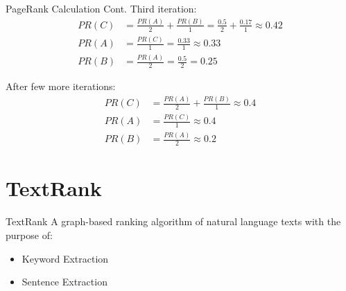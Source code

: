 \documentclass[10pt]{beamer}
\begin{document}
{
\begin{frame}{PageRank Calculation Cont.}\label{pg:calculation}
Third iteration:
 	\begin{align*}
    		PR(C) &=\frac{PR(A)}{2}  + \frac{PR(B)}{1}  = \frac{0.5}{2} + \frac{0.17}{1} \approx 0.42\\
            PR(A) &=\frac{PR(C)}{1}  = \frac{0.33}{1} \approx 0.33\\
            PR(B) &=\frac{PR(A)}{2}  = \frac{0.5}{2} = 0.25
	\end{align*}
  
After few more iterations:
 	\begin{align*}
    		PR(C) &=\frac{PR(A)}{2}  + \frac{PR(B)}{1}  \approx 0.4\\
            PR(A) &=\frac{PR(C)}{1}  \approx 0.4\\
            PR(B) &=\frac{PR(A)}{2}  \approx 0.2
	\end{align*}
\end{frame}
}
\section{TextRank}

\begin{frame}{TextRank}
A graph-based ranking algorithm of natural language texts with the purpose of:
  \begin{itemize}[<+- | alert@+>]
    \item Keyword Extraction
    \item Sentence Extraction
  \end{itemize}
\end{frame}
\end{document}
